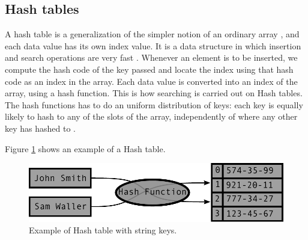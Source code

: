 \documentclass{sig-alternate-05-2015}
\begin{document}
    \subsection{Hash tables}
        A hash table is a generalization of the simpler notion of an ordinary array
        \cite{Cormen:Algorithms}, and each data value has its own index value.
        It is a data structure in which insertion and search operations are very fast \cite{Tuto:Data}.
        Whenever an element is to be inserted, we compute the hash code of the key passed and
        locate the index using that hash code as an index in the array.
        Each data value is converted into an index of the array, using a hash function.
        This is how searching is carried out on Hash tables. The hash functions has to
        do an uniform distribution of keys: each key is equally likely to hash to any of
        the slots of the array, independently of where any other key has hashed to \cite{Cormen:Algorithms}.

        Figure \ref{img:Hash} shows an example of a Hash table.
        \begin{figure}
          \centering
          \includegraphics[scale=0.57]{Hash.pdf}
          \caption{Example of Hash table with string keys.}
          \label{img:Hash}
        \end{figure}
\end{document}
